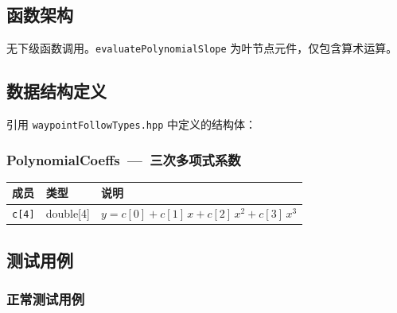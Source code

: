 \documentclass[a4paper,10pt]{article}
\begin{document}
\subsection{函数架构}

无下级函数调用。\texttt{evaluatePolynomialSlope} 为叶节点元件，仅包含算术运算。

\subsection{数据结构定义}

引用 \texttt{waypointFollowTypes.hpp} 中定义的结构体：

\subsubsection{PolynomialCoeffs~---~三次多项式系数}
\begin{longtable}{|L{3.5cm}|C{2cm}|L{9.5cm}|}
\hline
\textbf{成员} & \textbf{类型} & \textbf{说明} \\
\hline
\texttt{c[4]} & double[4] & $y = c[0] + c[1]\,x + c[2]\,x^2 + c[3]\,x^3$ \\
\hline
\end{longtable}

\subsection{测试用例}

\subsubsection{正常测试用例}
\end{document}
